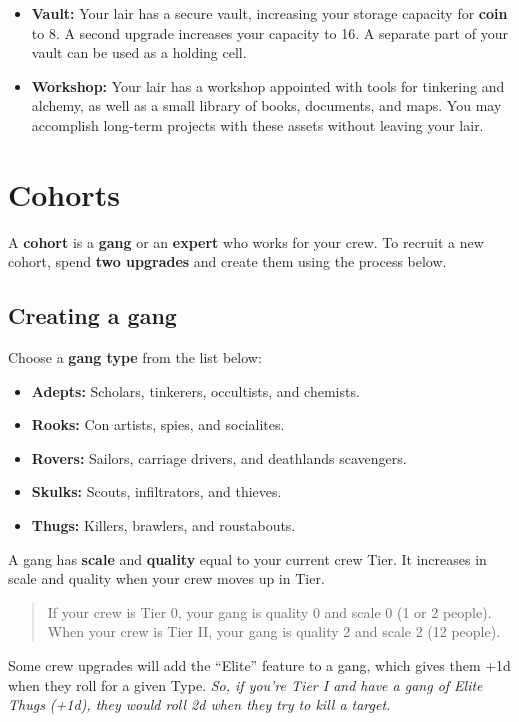 \documentclass[11pt,fleqn,a5paper]{book}
\newcommand{\gameterm}[1]{\textbf{#1}}
\begin{document}
\begin{itemize}
	\item \gameterm{Vault:} Your lair has a secure vault, increasing your storage capacity for \gameterm{coin}  to 8. A second upgrade increases your capacity to 16.  A separate part of your vault can be used as a holding cell.
	\item \gameterm{Workshop:}  Your lair has a workshop appointed with tools for tinkering and alchemy, as well as a small library of books, documents, and maps. You may accomplish long-term projects with these assets without leaving your lair.
\end{itemize}

\section{Cohorts}

A \textbf{cohort} is a \textbf{gang} or an \textbf{expert} who works for your crew. To recruit a new cohort, spend\textbf{ two upgrades} and create them using the process below.

\subsection{Creating a gang}

Choose a \textbf{gang type} from the list below:

\begin{itemize}
	\item \gameterm{Adepts:} Scholars, tinkerers, occultists, and chemists.
	\item \gameterm{Rooks:}  Con artists, spies, and socialites.
	\item \gameterm{Rovers:} Sailors, carriage drivers, and deathlands scavengers.
	\item \gameterm{Skulks:}  Scouts, infiltrators, and thieves.
	\item \gameterm{Thugs:}  Killers, brawlers, and roustabouts.
\end{itemize}

A gang has \textbf{scale} and \textbf{quality} equal to your current crew Tier. It increases in scale and quality when your crew moves up in Tier.

\begin{quote}
	If your crew is Tier 0, your gang is quality 0 and scale 0 (1 or 2 people). When your crew is Tier II, your gang is quality 2 and scale 2 (12 people).
\end{quote} 

Some crew upgrades will add the “Elite” feature to a gang, which gives them +1d when they roll for a given Type. \emph{So, if you’re Tier I and have a gang of Elite Thugs (+1d), they would roll 2d when they try to kill a target.}
\end{document}
